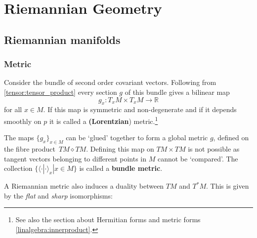 \chapter{Riemannian Geometry}

\section{Riemannian manifolds}
\subsection{Metric}

	\begin{definition}
		Consider the bundle of second order covariant vectors. Following from \ref{tensor:tensor_product} every section $g$ of this bundle gives a bilinear map \[g_x:T_xM\times T_xM\rightarrow\mathbb{R}\]
		for all $x\in M$. If this map is symmetric and non-degenerate and if it depends smoothly on $p$ it is called a \textbf{(Lorentzian}) metric.\footnote{See also the section about Hermitian forms and metric forms \ref{linalgebra:innerproduct}.}
		
		The maps $\{g_x\}_{x\in M}$ can be `glued' together to form a global metric $g$, defined on the fibre product\footnotemark\ $TM\diamond TM$. Defining this map on $TM\times TM$ is not possible as tangent vectors belonging to different points in $M$ cannot be `compared'. The collection $\{\langle\cdot|\cdot\rangle_x|x\in M\}$ is called a \textbf{bundle metric}.
	\end{definition}

	A Riemannian metric also induces a duality between $TM$ and $T^*M$. This is given by the \textit{flat} and \textit{sharp} isomorphisms:


